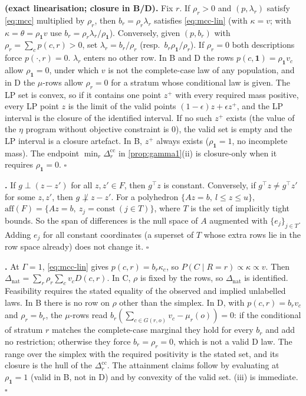 \documentclass{article}
\theoremstyle{plain}
\theoremstyle{definition}
\theoremstyle{remark}
\newcommand{\one}{\mathbf{1}}
\newcommand{\Dnat}{\Delta_{\mathrm{nat}}}
\begin{document}
\textbf{ (exact linearisation; closure in B/D).} Fix $r$.
If $\rho_r>0$ and $(p,\lambda_r)$ satisfy \eqref{eq:mcc} multiplied by
$\rho_r$, then $b_r=\rho_r\lambda_r$ satisfies \eqref{eq:mcc-lin} (with
$\kappa=v$; with $\kappa=\theta=\rho_{\one}v$ use
$b_r=\rho_r\lambda_r/\rho_{\one}$). Conversely, given $(p,b_r)$ with
$\rho_r=\sum_c p(c,r)>0$, set $\lambda_r=b_r/\rho_r$ (resp.\
$b_r\rho_{\one}/\rho_r$). If $\rho_r=0$ both descriptions force $p(\cdot,r)=0$.
$\lambda_r$ enters no other row. In B and D the rows
$p(c,\one)=\rho_{\one}v_c$ allow $\rho_{\one}=0$, under which $v$ is not the
complete-case law of any population, and in D the $\mu$-rows allow
$\rho_r=0$ for a stratum whose conditional law is given. The LP set is
convex, so if it contains one point $z^+$ with every required mass positive,
every LP point $z$ is the limit of the valid points $(1-\epsilon)z+\epsilon z^+$,
and the LP interval is the closure of the identified interval. If no such
$z^+$ exists (the value of the $\eta$ program without objective constraint is
$0$), the valid set is empty and the LP interval is a closure artefact. In B,
$z^+$ always exists ($\rho_{\one}=1$, no incomplete mass). The endpoint
$\min_r\Delta^{\mathrm{cc}}_r$ in \cref{prop:gamma1}(ii) is closure-only when
it requires $\rho_{\one}=0$. $\square$

\textbf{.} If $g\perp(z-z')$ for all $z,z'\in F$, then
$g^\top z$ is constant. Conversely, if $g^\top z\neq g^\top z'$ for some
$z,z'$, then $g\not\perp z-z'$. For a polyhedron
$\{Az=b,\ l\le z\le u\}$, $\mathrm{aff}(F)=\{Az=b,\ z_j=\mathrm{const}\ (j\in T)\}$,
where $T$ is the set of implicitly tight bounds. So the span of differences
is the null space of $A$ augmented with $\{e_j\}_{j\in T}$. Adding $e_j$ for
all constant coordinates (a superset of $T$ whose extra rows lie in the
row space already) does not change it. $\square$

\textbf{.} At $\Gamma=1$, \eqref{eq:mcc-lin} gives
$p(c,r)=b_r\kappa_c$, so $P(C\mid R=r)\propto\kappa\propto v$. Then
$\Dnat=\sum_r\rho_r\sum_c v_cD(c,r)$. In C, $\rho$ is fixed by the rows, so
$\Dnat$ is identified. Feasibility requires the stated equality of the
observed and implied unlabelled laws. In B there is no row on $\rho$ other than
the simplex. In D, with $p(c,r)=b_rv_c$ and $\rho_r=b_r$, the $\mu$-rows read
$b_r(\sum_{c\in G(r,o)}v_c-\mu_r(o))=0$: if the conditional of stratum $r$
matches the complete-case marginal they hold for every $b_r$ and add no
restriction; otherwise they force $b_r=\rho_r=0$, which is not a valid D law.
The range over the simplex with the required positivity is the stated set,
and its closure is the hull of the $\Delta^{\mathrm{cc}}_r$. The attainment
claims follow by evaluating at $\rho_{\one}=1$ (valid in B, not in D) and by
convexity of the valid set. (iii) is immediate. $\square$
\end{document}

